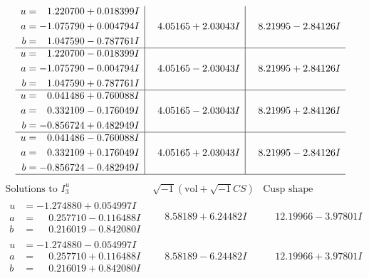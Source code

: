 \documentclass[1p]{elsarticle_modified}
\theoremstyle{definition}
\newcommand{\I}{\sqrt{-1}}
\begin{document}
$$\begin{array}{c|c|c}
\begin{aligned}
u &= \phantom{-}1.220700 + 0.018399 I \\
a &= -1.075790 + 0.004794 I \\
b &= \phantom{-}1.047590 - 0.787761 I\end{aligned}
 & \phantom{-}4.05165 + 2.03043 I & \phantom{-}8.21995 - 2.84126 I \\ \hline\begin{aligned}
u &= \phantom{-}1.220700 - 0.018399 I \\
a &= -1.075790 - 0.004794 I \\
b &= \phantom{-}1.047590 + 0.787761 I\end{aligned}
 & \phantom{-}4.05165 - 2.03043 I & \phantom{-}8.21995 + 2.84126 I \\ \hline\begin{aligned}
u &= \phantom{-}0.041486 + 0.760088 I \\
a &= \phantom{-}0.332109 - 0.176049 I \\
b &= -0.856724 + 0.482949 I\end{aligned}
 & \phantom{-}4.05165 - 2.03043 I & \phantom{-}8.21995 + 2.84126 I \\ \hline\begin{aligned}
u &= \phantom{-}0.041486 - 0.760088 I \\
a &= \phantom{-}0.332109 + 0.176049 I \\
b &= -0.856724 - 0.482949 I\end{aligned}
 & \phantom{-}4.05165 + 2.03043 I & \phantom{-}8.21995 - 2.84126 I\\
 \hline 
 \end{array}$$\newpage$$\begin{array}{c|c|c}  
\text{Solutions to }I^u_{3}& \I (\text{vol} + \sqrt{-1}CS) & \text{Cusp shape}\\
 \hline 
\begin{aligned}
u &= -1.274880 + 0.054997 I \\
a &= \phantom{-}0.257710 - 0.116488 I \\
b &= \phantom{-}0.216019 - 0.842080 I\end{aligned}
 & \phantom{-}8.58189 + 6.24482 I & \phantom{-}12.19966 - 3.97801 I \\ \hline\begin{aligned}
u &= -1.274880 - 0.054997 I \\
a &= \phantom{-}0.257710 + 0.116488 I \\
b &= \phantom{-}0.216019 + 0.842080 I\end{aligned}
 & \phantom{-}8.58189 - 6.24482 I & \phantom{-}12.19966 + 3.97801 I \\ \hline\begin{aligned}

\end{aligned}
\end{array}$$
\end{document}
